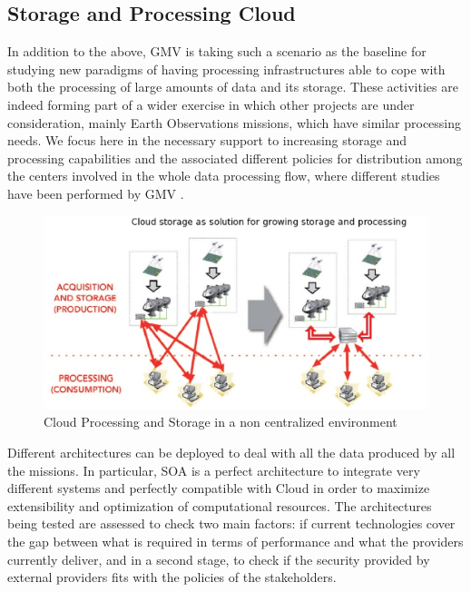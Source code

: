 \subsection{Storage and Processing Cloud}
In addition to the above, GMV is taking such a scenario as the baseline for studying  new paradigms of having processing infrastructures  able to cope with both the processing of large amounts of data and its storage. These activities  are indeed forming part of a wider exercise in which other projects are under consideration, mainly Earth Observations missions, which have similar processing needs. We focus here in the necessary support to increasing storage and processing capabilities and the associated different policies for distribution among the centers involved in the whole data processing flow, where different studies have been performed by GMV \citep{RubenPerez1}.
\begin{figure}[ht]
\centering
\includegraphics[width=80 mm]{part10/Perez_P022/P022_f3.eps}
\caption{Cloud Processing and Storage in a non centralized environment}

\end{figure}
Different architectures can be deployed to deal with all the data produced by all the missions. In particular, SOA is a perfect architecture to integrate very different systems and perfectly compatible with Cloud in order to maximize extensibility and optimization of computational resources. The architectures being tested are assessed to check two main factors: if current technologies cover the gap between what is required in terms of performance and what the providers currently deliver, and in a second stage, to check if the security provided by external providers fits with the policies of the stakeholders.

